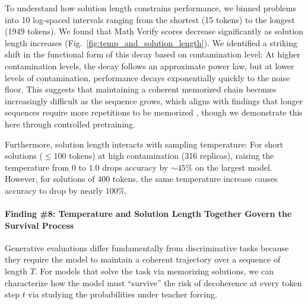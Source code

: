To understand how solution length constrains performance, we binned problems into 10 log-spaced intervals ranging from the shortest (15 tokens) to the longest (1949 tokens).
We found that Math Verify scores decrease significantly as solution length increases (Fig.~\ref{fig:temp_and_solution_length}). 
We identified a striking shift in the functional form of this decay based on contamination level:
At higher contamination levels, the decay follows an approximate power law, but at lower levels of contamination, performance decays exponentially quickly to the noise floor.
This suggests that maintaining a coherent memorized chain becomes increasingly difficult as the sequence grows, which aligns with findings that longer sequences require more repetitions to be memorized \citep{jiang2025a,lu2024scaling}, though we demonstrate this here through controlled pretraining.

Furthermore, solution length interacts with sampling temperature:
For short solutions ($\leq 100$ tokens) at high contamination (316 replicas), raising the temperature from $0$ to $1.0$ drops accuracy by $\sim45\%$ on the largest model. However, for solutions of $400$ tokens, the same temperature increase causes accuracy to drop by nearly $100\%$.


\paragraph{Finding \#8: Temperature and Solution Length Together Govern the Survival Process}

Generative evaluations differ fundamentally from discriminative tasks because they require the model to maintain a coherent trajectory over a sequence of length $T$.
For models that solve the task via memorizing solutions, we can characterize how the model must ``survive'' the risk of decoherence at every token step $t$ via studying the probabilities under teacher forcing.

